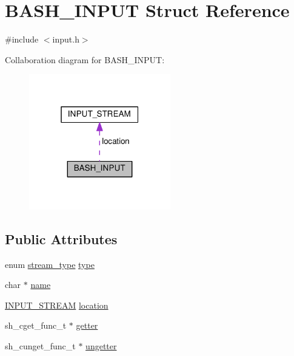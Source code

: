 \hypertarget{structBASH__INPUT}{}\section{B\+A\+S\+H\+\_\+\+I\+N\+P\+UT Struct Reference}
\label{structBASH__INPUT}


{\ttfamily \#include $<$input.\+h$>$}



Collaboration diagram for B\+A\+S\+H\+\_\+\+I\+N\+P\+UT\+:
\nopagebreak
\begin{figure}[H]
\begin{center}
\leavevmode
\includegraphics[width=175pt]{structBASH__INPUT__coll__graph}
\end{center}
\end{figure}
\subsection*{Public Attributes}
\begin{DoxyCompactItemize}
\item 
enum \hyperlink{input_8h_a565ef8a9f2a47f27189e6a48b5dc615a}{stream\+\_\+type} \hyperlink{structBASH__INPUT_aa1a38ed3faabc508930dc2405db9bea3}{type}
\item 
char $\ast$ \hyperlink{structBASH__INPUT_ae0a3b3bf98cfa7f6dc598134e6db39d2}{name}
\item 
\hyperlink{unionINPUT__STREAM}{I\+N\+P\+U\+T\+\_\+\+S\+T\+R\+E\+AM} \hyperlink{structBASH__INPUT_a6ea2dbded24d287d37b95deb092da0fd}{location}
\item 
sh\+\_\+cget\+\_\+func\+\_\+t $\ast$ \hyperlink{structBASH__INPUT_aa4da0c40a319c020cf936b97ce82b783}{getter}
\item 
sh\+\_\+cunget\+\_\+func\+\_\+t $\ast$ \hyperlink{structBASH__INPUT_aa5691d540e34f34766b758ded878d07c}{ungetter}
\end{DoxyCompactItemize}


